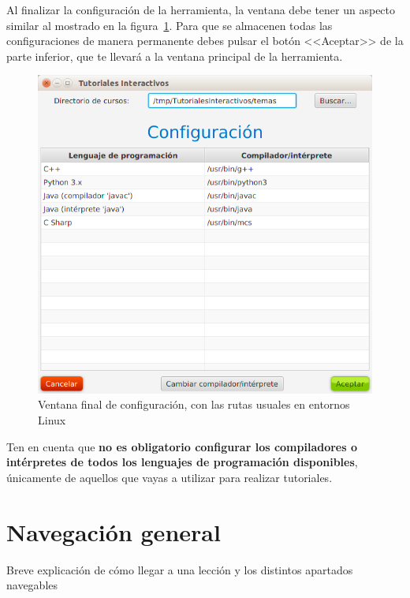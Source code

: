 \documentclass[]{article}
\begin{document}
Al finalizar la configuración de la herramienta, la ventana debe tener un aspecto similar al mostrado en la figura~\ref{fig:config3}. Para que se almacenen todas las configuraciones de manera permanente debes pulsar el botón <<Aceptar>> de la parte inferior, que te llevará a la ventana principal de la herramienta.
%
\begin{figure}[tbp]
\begin{center}
\includegraphics[scale=0.4]{Configuracion_lenguajes_relleno.png}
\end{center}
\caption{Ventana final de configuración, con las rutas usuales en entornos Linux\label{fig:config3}}
\end{figure}
%
Ten en cuenta que \textbf{no es obligatorio configurar los compiladores o intérpretes de todos los lenguajes de programación disponibles}, únicamente de aquellos que vayas a utilizar para realizar tutoriales.


\section{Navegación general}
Breve explicación de cómo llegar a una lección y los distintos apartados navegables
\end{document}
